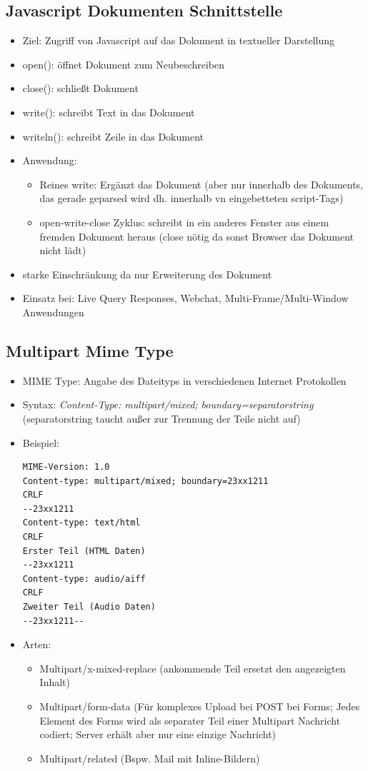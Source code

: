 \documentclass{article} %
\begin{document}
	\subsection{Javascript Dokumenten Schnittstelle}
	\begin{itemize}
		\item Ziel: Zugriff von Javascript auf das Dokument in textueller Darstellung
		\item open(): öffnet Dokument zum Neubeschreiben
		\item close(): schließt Dokument
		\item write(): schreibt Text in das Dokument
		\item writeln(): schreibt Zeile in das Dokument
		\item Anwendung:
		\begin{itemize}
			\item Reines write: Ergänzt das Dokument (aber nur innerhalb des Dokuments, das gerade geparsed wird dh. innerhalb vn eingebetteten script-Tags)
			\item open-write-close Zyklus: schreibt in ein anderes Fenster aus einem fremden Dokument heraus (close nötig da sonst Browser das Dokument nicht lädt)
		\end{itemize}
		\item starke Einschränkung da nur Erweiterung des Dokument
		\item Einsatz bei: Live Query Responses, Webchat, Multi-Frame/Multi-Window Anwendungen
	\end{itemize}
	\subsection{Multipart Mime Type}
	\begin{itemize}
		\item MIME Type: Angabe des Dateityps in verschiedenen Internet Protokollen
		\item Syntax: \textit{Content-Type: multipart/mixed; boundary=separatorstring}\\
		(separatorstring taucht außer zur Trennung der Teile nicht auf)
		\item Beispiel:
		\begin{lstlisting}
MIME-Version: 1.0
Content-type: multipart/mixed; boundary=23xx1211
CRLF
--23xx1211
Content-type: text/html
CRLF
Erster Teil (HTML Daten)
--23xx1211
Content-type: audio/aiff
CRLF
Zweiter Teil (Audio Daten)
--23xx1211--
		\end{lstlisting}
		\item Arten:
		\begin{itemize}
			\item Multipart/x-mixed-replace (ankommende Teil ersetzt den angezeigten Inhalt)
			\item Multipart/form-data (Für komplexes Upload bei POST bei Forms; Jedes Element des Forms wird als separater Teil einer Multipart Nachricht codiert; Server erhält aber nur eine einzige Nachricht)
			\item Multipart/related (Bspw. Mail mit Inline-Bildern)
		\end{itemize}
	\end{itemize}
\end{document}
